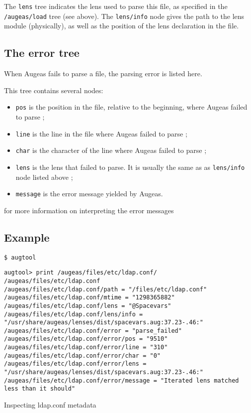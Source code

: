 The \verb!lens! tree indicates the lens used to parse this file, as specified in the \nolinkurl{/augeas/load} tree (see above). The \verb!lens/info! node gives the path to the lens module (physically), as well as the position of the lens declaration in the file.

\subsection{The error tree}

When Augeas fails to parse a file, the parsing error is listed here.

This tree contains several nodes:

\begin{itemize}
\item
  \verb!pos! is the position in the file, relative to the beginning, where Augeas failed to parse ;
\item
  \verb!line! is the line in the file where Augeas failed to parse ;
\item
  \verb!char! is the character of the line where Augeas failed to parse ;
\item
  \verb!lens! is the lens that failed to parse. It is usually the same as as \verb!lens/info! node listed above ;
\item
  \verb!message! is the error message yielded by Augeas.
\end{itemize}

 for more information on interpreting the error messages


\subsection{Example}

\begin{listing}
  \begin{verbatim}
$ augtool 
  \end{verbatim}
  \begin{verbatim}
augtool> print /augeas/files/etc/ldap.conf/
/augeas/files/etc/ldap.conf
/augeas/files/etc/ldap.conf/path = "/files/etc/ldap.conf"
/augeas/files/etc/ldap.conf/mtime = "1298365882"
/augeas/files/etc/ldap.conf/lens = "@Spacevars"
/augeas/files/etc/ldap.conf/lens/info = "/usr/share/augeas/lenses/dist/spacevars.aug:37.23-.46:"
/augeas/files/etc/ldap.conf/error = "parse_failed"
/augeas/files/etc/ldap.conf/error/pos = "9510"
/augeas/files/etc/ldap.conf/error/line = "310"
/augeas/files/etc/ldap.conf/error/char = "0"
/augeas/files/etc/ldap.conf/error/lens = "/usr/share/augeas/lenses/dist/spacevars.aug:37.23-.46:"
/augeas/files/etc/ldap.conf/error/message = "Iterated lens matched less than it should"
  \end{verbatim}
  \caption{Inspecting ldap.conf metadata}
  \label{lst:metadata_ldap_conf}
\end{listing}


